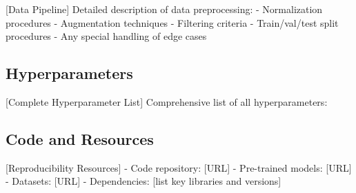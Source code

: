 [Data Pipeline] Detailed description of data preprocessing:
- Normalization procedures
- Augmentation techniques
- Filtering criteria
- Train/val/test split procedures
- Any special handling of edge cases

\subsection{Hyperparameters}
\label{app:hyperparameters-table}

[Complete Hyperparameter List] Comprehensive list of all hyperparameters:


\subsection{Code and Resources}
\label{app:code}

[Reproducibility Resources]
- Code repository: [URL]
- Pre-trained models: [URL]
- Datasets: [URL]
- Dependencies: [list key libraries and versions]

